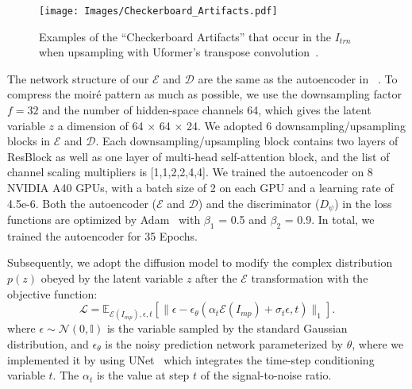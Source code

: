 \begin{figure*}[!t]
  \centering
    \texttt{[image: Images/Checkerboard\_Artifacts.pdf]}
  \caption{Examples of the ``Checkerboard Artifacts'' that occur in the $I_{trn}$ when upsampling with Uformer’s transpose convolution~\cite{Wang2022Uformer}.} 
  \label{fig:checkerboard_artifacts}
\end{figure*}

The network structure of our $\mathcal{E}$ and $\mathcal{D}$ are the same as the autoencoder in ~\cite{Rombach2022LDM}.
To compress the moiré pattern as much as possible, we use the downsampling factor $f=\text{32}$ and the number of hidden-space channels 64, which gives the latent variable $z$ a dimension of 64 $\times$ 64 $\times$ 24. 
We adopted 6 downsampling/upsampling blocks in $\mathcal{E}$ and $\mathcal{D}$. Each downsampling/upsampling block contains two layers of ResBlock as well as one layer of multi-head self-attention block, and the list of channel scaling multipliers is [1,1,2,2,4,4]. We trained the autoencoder on 8 NVIDIA A40 GPUs, with a batch size of 2 on each GPU and a learning rate of 4.5e-6. 
Both the autoencoder ($\mathcal{E}$ and $\mathcal{D}$) and the discriminator ($D_{\psi}$) in the loss functions are optimized by Adam~\cite{kingma2014adam} with $\beta_1$ = 0.5 and $\beta_2$ = 0.9.
In total, we trained the autoencoder for 35 Epochs.

Subsequently, we adopt the diffusion model to modify the complex distribution $p(z)$ obeyed by the latent variable $z$ after the $\mathcal{E}$ transformation with the objective function:
\begin{equation}
\mathcal{L}=\mathbb{E}_{\mathcal{E}\left(I_{m p}\right), \epsilon, t}\left[\| \epsilon-\epsilon_\theta\left(\alpha_t \mathcal{E}\left(I_{m p}\right)+\sigma_t \epsilon, t\right) \|_1\right].
\end{equation}
where $\epsilon\sim\mathcal{N}(0, \mathbb{I})$ is the variable sampled by the standard Gaussian distribution, and $\epsilon_\theta$ is the noisy prediction network parameterized by $\theta$, where we implemented it by using UNet~\cite{ronneberger2015u} which integrates the time-step conditioning variable $t$. The $\alpha_t$ is the value at step $t$ of the signal-to-noise ratio.

